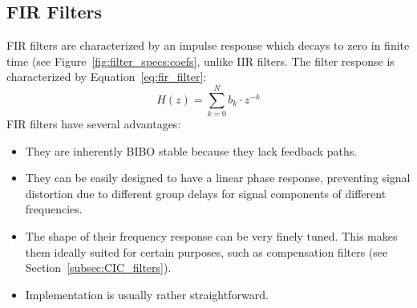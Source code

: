 %
%
\subsection{FIR Filters} %
\label{subsec:FIR_filters}

FIR filters are  characterized by an impulse response which  decays to zero in
finite time (see  Figure~\ref{fig:filter_specs:coefs}, unlike IIR filters. The
filter response is characterized by Equation~\ref{eq:fir_filter}:
\begin{equation}
    \label{eq:fir_filter}
    H(z) = \sum_{k=0}^{N} b_k \cdot z^{-k}
\end{equation}
FIR filters have several advantages:
\begin{itemize}\tightlist
    \item
        They are inherently BIBO stable because they lack feedback paths.
    \item
        They  can  be  easily  designed  to  have  a  linear  phase  response,
        preventing signal distortion due to  different group delays for signal
        components of different frequencies.
    \item
        The shape of  their frequency response can be  very finely tuned. This
        makes them ideally  suited for certain purposes,  such as compensation
        filters (see Section~\ref{subsec:CIC_filters}).
    \item
        Implementation is usually rather straightforward.
\end{itemize}

